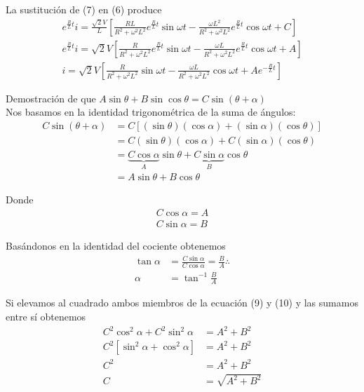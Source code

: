 \documentclass{article}
\begin{document}
La sustitución de (7) en (6) produce
\begin{align}
	e^{\frac{R}{L}t}i = \frac{\sqrt{2}V}{L}\left[ \frac{RL}{R^2 + \omega^{2}L^2}e^{\frac{R}{L}t}\sin \omega t -\frac{\omega L^2}{R^2 + \omega^{2}L^2}e^{\frac{R}{L}t} \cos \omega t + C\right]\nonumber\\
	e^{\frac{R}{L}t}i = \sqrt{2}V\left[ \frac{R}{R^2 + \omega^{2}L^2}e^{\frac{R}{L}t}\sin \omega t -\frac{\omega L}{R^2 + \omega^{2}L^2}e^{\frac{R}{L}t} \cos \omega t + A \right]\nonumber\\
	i = \sqrt{2}V\left[ \frac{R}{R^2 + \omega^{2}L^2}\sin \omega t -\frac{\omega L}{R^2 + \omega^{2}L^2} \cos \omega t + Ae^{-\frac{R}{L}t}\right]
\end{align}

\begin{info}
	Demostración de que $A\sin \theta + B\sin\cos \theta = C \sin (\theta + \alpha)$\\
	Nos basamos en la identidad trigonométrica de la suma de ángulos:
	\begin{align}
		C\sin(\theta + \alpha) &= C \left[ (\sin \theta) (\cos \alpha) + (\sin \alpha) (\cos \theta) \right]\nonumber\\
		&= C(\sin \theta) (\cos \alpha) + C(\sin \alpha) (\cos \theta)\nonumber\\
		&= \underbrace{C\cos \alpha}_{A} \sin \theta + \underbrace{C\sin \alpha}_{B}\cos \theta \nonumber \\
		&= A \sin \theta + B \cos \theta\nonumber
	\end{align}

Donde 
\begin{align}
	C\cos \alpha = A\\
	C\sin \alpha = B
\end{align}

Basándonos en la identidad del cociente obtenemos 
\begin{align}
	\tan \alpha &= \frac{C\sin \alpha}{C\cos \alpha} = \frac{B}{A}\nonumber \therefore\\
	\alpha &= \tan^{-1} \frac{B}{A}
\end{align}

Si elevamos al cuadrado ambos miembros de la ecuación (9) y (10) y las sumamos entre sí obtenemos
\begin{align}
	C^2 \cos^2 \alpha  + C^2 \sin^2\alpha &= A^2 + B^2\nonumber\\
	C^2 \left[ \sin^2 \alpha + \cos^2 \alpha \right] &= A^2 + B^2\nonumber\\
	C^2 &= A^2 + B^2\nonumber\\
	C &= \sqrt{A^2 + B^2}
\end{align}
\end{info}
\end{document}
